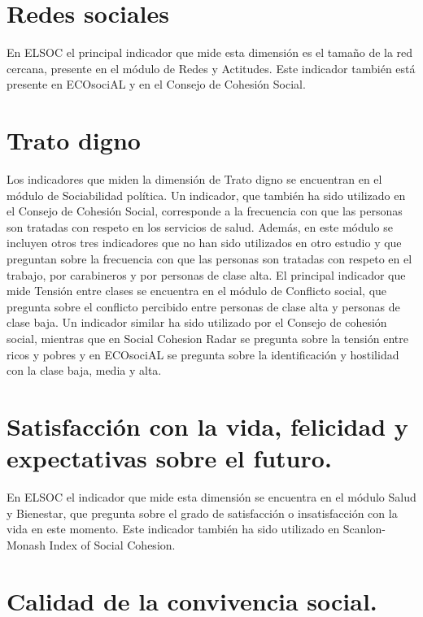 \documentclass[
  12pt,
]{book}
\begin{document}
\hypertarget{redes-sociales-1}{%
\section{Redes sociales}\label{redes-sociales-1}}

En ELSOC el principal indicador que mide esta dimensión es el tamaño de la red cercana, presente en el módulo de Redes y Actitudes. Este indicador también está presente en ECOsociAL y en el Consejo de Cohesión Social.

\hypertarget{trato-digno-1}{%
\section{Trato digno}\label{trato-digno-1}}

Los indicadores que miden la dimensión de Trato digno se encuentran en el módulo de Sociabilidad política. Un indicador, que también ha sido utilizado en el Consejo de Cohesión Social, corresponde a la frecuencia con que las personas son tratadas con respeto en los servicios de salud. Además, en este módulo se incluyen otros tres indicadores que no han sido utilizados en otro estudio y que preguntan sobre la frecuencia con que las personas son tratadas con respeto en el trabajo, por carabineros y por personas de clase alta.
El principal indicador que mide Tensión entre clases se encuentra en el módulo de Conflicto social, que pregunta sobre el conflicto percibido entre personas de clase alta y personas de clase baja. Un indicador similar ha sido utilizado por el Consejo de cohesión social, mientras que en Social Cohesion Radar se pregunta sobre la tensión entre ricos y pobres y en ECOsociAL se pregunta sobre la identificación y hostilidad con la clase baja, media y alta.

\hypertarget{satisfacciuxf3n-con-la-vida-felicidad-y-expectativas-sobre-el-futuro.-1}{%
\section{Satisfacción con la vida, felicidad y expectativas sobre el futuro.}\label{satisfacciuxf3n-con-la-vida-felicidad-y-expectativas-sobre-el-futuro.-1}}

En ELSOC el indicador que mide esta dimensión se encuentra en el módulo Salud y Bienestar, que pregunta sobre el grado de satisfacción o insatisfacción con la vida en este momento. Este indicador también ha sido utilizado en Scanlon-Monash Index of Social Cohesion.

\hypertarget{calidad-de-la-convivencia-social.-1}{%
\section{Calidad de la convivencia social.}\label{calidad-de-la-convivencia-social.-1}}
\end{document}

